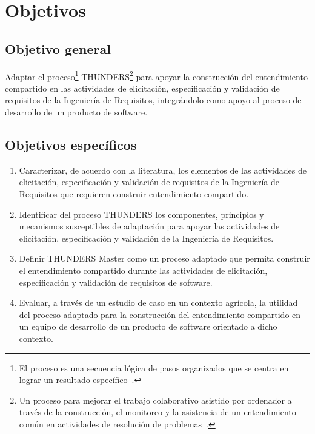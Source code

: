 \documentclass[12pt,letterpaper,oneside]{report}
\begin{document}
\section{Objetivos}

\subsection{Objetivo general}
Adaptar el proceso\footnote{El proceso es una secuencia lógica de pasos
organizados que se centra en lograr un resultado específico~\cite{humphrey1989}.}
THUNDERS\footnote{Un proceso para mejorar el trabajo colaborativo asistido por
ordenador a través de la construcción, el monitoreo y la asistencia de un
entendimiento común en actividades de resolución de
problemas~\cite{agredo2022thesis}.} para apoyar la construcción del
entendimiento compartido en las actividades de elicitación, especificación y
validación de requisitos de la Ingeniería de Requisitos, integrándolo como apoyo
al proceso de desarrollo de un producto de software.

\subsection{Objetivos específicos}
\begin{enumerate}
  \item Caracterizar, de acuerdo con la literatura, los elementos de las
        actividades de elicitación, especificación y validación de requisitos
        de la Ingeniería de Requisitos que requieren construir entendimiento
        compartido.
  \item Identificar del proceso THUNDERS los componentes, principios y
        mecanismos susceptibles de adaptación para apoyar las actividades de
        elicitación, especificación y validación de la Ingeniería de
        Requisitos.
  \item Definir THUNDERS Master como un proceso adaptado que permita construir
        el entendimiento compartido durante las actividades de elicitación,
        especificación y validación de requisitos de software.
  \item Evaluar, a través de un estudio de caso en un contexto agrícola, la
        utilidad del proceso adaptado para la construcción del entendimiento
        compartido en un equipo de desarrollo de un producto de software
        orientado a dicho contexto.
\end{enumerate}
\end{document}
